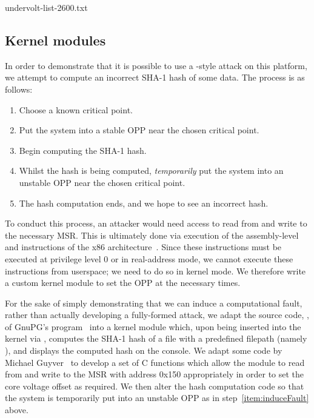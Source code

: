 
    {undervolt-list-2600.txt}    

\subsection{Kernel modules}
\label{sec:modules}

In order to demonstrate that it is possible to use a \clkscrew{}-style attack
on this platform, we attempt to compute an incorrect SHA-1 hash of some data.
The process is as follows:

\begin{enumerate}
    \item Choose a known critical point.
    \item Put the system into a stable OPP near the chosen critical point.
    \item Begin computing the SHA-1 hash.
    \item \label{item:induceFault} Whilst the hash is being computed,
        \emph{temporarily} put the system into an unstable OPP near the chosen
        critical point.
    \item The hash computation ends, and we hope to see an incorrect hash.
\end{enumerate}

To conduct this process, an attacker would need access to read from and write to
the necessary MSR. This is ultimately done via execution of the assembly-level
 and  instructions of the x86
architecture~\cite[Vol. 2, §§4.3–4]{intelDevManual}. Since these instructions
must be executed at privilege level 0 or in real-address mode, we cannot
execute these instructions from userspace; we need to do so in kernel mode. We
therefore write a custom kernel module to set the OPP at the necessary times.

For the sake of simply demonstrating that we can induce a computational fault,
rather than actually developing a fully-formed attack, we adapt the source code,
, of GnuPG's  program~\cite{gnupgSHA} into a
kernel module which, upon being inserted into the kernel via ,
computes the SHA-1 hash of a file with a predefined filepath (namely
), and displays the computed hash on the console.
We adapt some code by Michael Guyver~\cite{guyverCode} to develop a set of C
functions which allow the module to read from and write to the MSR with address
0x150 appropriately in order to set the core voltage offset as required. We then
alter the hash computation code so that the system is temporarily put into an
unstable OPP as in step~\ref{item:induceFault} above.

